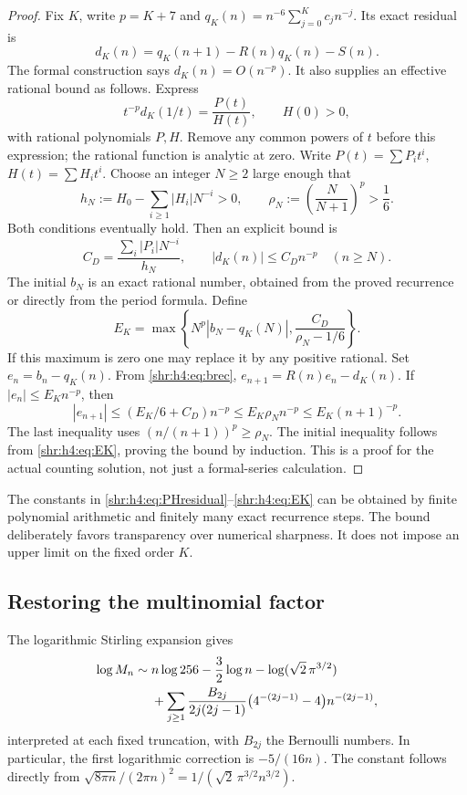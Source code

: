 \documentclass[11pt,letterpaper]{article}
\numberwithin{equation}{section}
\theoremstyle{definition}
\newcommand{\1}{\mathbf 1}
\begin{document}
\begin{proof}
Fix $K$, write $p=K+7$ and
$q_K(n)=n^{-6}\sum_{j=0}^Kc_jn^{-j}$. Its exact residual is
\[
 d_K(n)=q_K(n+1)-R(n)q_K(n)-S(n).
\]
The formal construction says $d_K(n)=O(n^{-p})$. It also supplies an
effective rational bound as follows. Express
\begin{equation}
 t^{-p}d_K(1/t)=\frac{P(t)}{H(t)},\qquad H(0)>0,
 \label{shr:h4:eq:PHresidual}
\end{equation}
with rational polynomials $P,H$. Remove any common powers of $t$ before
this expression; the rational function is analytic at zero. Write
$P(t)=\sum P_it^i$, $H(t)=\sum H_it^i$.
Choose an integer $N\ge2$ large enough that
\begin{equation}
 h_N:=H_0-\sum_{i\ge1}|H_i|N^{-i}>0,\qquad
 \rho_N:=\left(\frac N{N+1}\right)^p>\frac16.
 \label{shr:h4:eq:Nchoices}
\end{equation}
Both conditions eventually hold. Then an explicit bound is
\begin{equation}
 C_D=\frac{\sum_i|P_i|N^{-i}}{h_N},\qquad
 |d_K(n)|\le C_Dn^{-p}\quad(n\ge N).
 \label{shr:h4:eq:CD}
\end{equation}
The initial $b_N$ is an exact rational number, obtained from the proved
recurrence or directly from the period formula. Define
\begin{equation}
 E_K=\max\left\{N^p|b_N-q_K(N)|,
                    \frac{C_D}{\rho_N-1/6}\right\}.
 \label{shr:h4:eq:EK}
\end{equation}
If this maximum is zero one may replace it by any positive rational.
Set $e_n=b_n-q_K(n)$. From \eqref{shr:h4:eq:brec},
$e_{n+1}=R(n)e_n-d_K(n)$. If $|e_n|\le E_Kn^{-p}$, then
\[
 |e_{n+1}|\le(E_K/6+C_D)n^{-p}
 \le E_K\rho_Nn^{-p}\le E_K(n+1)^{-p}.
\]
The last inequality uses $(n/(n+1))^p\ge\rho_N$.
The initial inequality follows from \eqref{shr:h4:eq:EK}, proving the bound by
induction. This is a proof for the actual counting solution, not just a
formal-series calculation.
\end{proof}

The constants in \eqref{shr:h4:eq:PHresidual}--\eqref{shr:h4:eq:EK} can be obtained by
finite polynomial arithmetic and finitely many exact recurrence steps.
The bound deliberately favors transparency over numerical sharpness.
It does not impose an upper limit on the fixed order $K$.

\subsection{Restoring the multinomial factor}
The logarithmic Stirling expansion gives
\begin{align}
 \log M_n\sim{}&n\log256-\frac32\log n
             -\log(\sqrt2\,\pi^{3/2})\notag\\
 &+\sum_{j\ge1}\frac{B_{2j}}{2j(2j-1)}
                   \bigl(4^{-(2j-1)}-4\bigr)n^{-(2j-1)},
 \label{shr:h4:eq:logM}
\end{align}
interpreted at each fixed truncation, with $B_{2j}$ the Bernoulli numbers.
In particular, the first logarithmic correction is $-5/(16n)$.
The constant follows directly from
$\sqrt{8\pi n}/(2\pi n)^2=1/(\sqrt2\,\pi^{3/2}n^{3/2})$.
\end{document}
